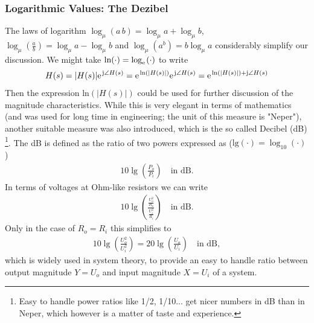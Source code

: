 \documentclass[11pt,a4paper,DIV=12]{scrartcl}
\numberwithin{equation}{section}
\numberwithin{figure}{section}
\begin{document}
\subsubsection{Logarithmic Values: The Dezibel}
The laws of logarithm $\log_\mu (a \, b) = \log_\mu a + \log_\mu b$,
$\log_\mu (\frac{a}{b}) = \log_\mu a - \log_\mu b$
and
$\log_\mu(a^b) = b \log_\mu a$
considerably simplify our discussion.
%
We might take $\text{ln}(\cdot) = \log_\e(\cdot)$ to write
\begin{align}
H(s) = |H(s)| \e^{\im \angle H(s)} = \e^{\text{ln}(|H(s)|)} \e^{\im \angle H(s)}=
\e^{\text{ln}(|H(s)|)+\im \angle H(s)}
\end{align}
Then the expression $\text{ln}(|H(s)|)$ could be used for further discussion
of the magnitude characteristics.
%
While this is very elegant in terms of mathematics
(and was used for long time in engineering; the unit of this
measure is "Neper"),
another suitable measure was also introduced, which is the so called Decibel (dB)
\footnote{Easy to handle power ratios like 1/2, 1/10... get nicer numbers in dB
than in Neper, which however is a matter of taste and experience.}.
The dB is defined as the ratio of two powers expressed as ($\text{lg}(\cdot) = \log_{10}(\cdot)$)
\begin{align}
  10 \lg (\frac{P_o}{P_i}) \quad \text{in dB}.
\end{align}
%
In terms of voltages at Ohm-like resistors we can write
\begin{align}
  10 \lg (\frac{\frac{U_o^2}{R_o}}{\frac{U_i^2}{R_i}}) \quad \text{in dB}.
\end{align}
Only in the case of $R_o = R_i$ this simplifies to
\begin{align}
  10 \lg (\frac{U^2_o}{U^2_i}) = 20 \lg (\frac{U_o}{U_i}) \quad \text{in dB},
\end{align}
which is widely used in system theory, to provide an easy to handle ratio between
output magnitude $Y=U_o$ and input magnitude $X=U_i$ of a system.
\end{document}
